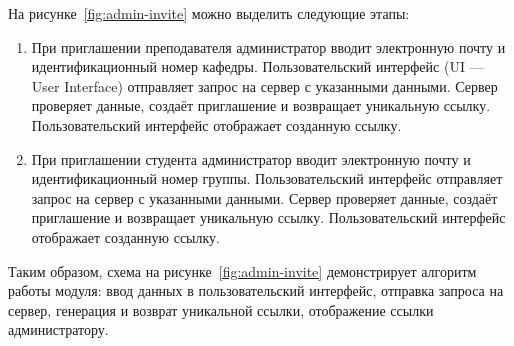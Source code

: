 На рисунке~\ref{fig:admin-invite} можно выделить следующие этапы:
\begin{enumerate}
    \item При приглашении преподавателя администратор вводит электронную почту и идентификационный номер кафедры. Пользовательский интерфейс (UI — User Interface) отправляет запрос на сервер с указанными данными. Сервер проверяет данные, создаёт приглашение и возвращает уникальную ссылку. Пользовательский интерфейс отображает созданную ссылку.

    \item При приглашении студента администратор вводит электронную почту и идентификационный номер группы. Пользовательский интерфейс отправляет запрос на сервер с указанными данными. Сервер проверяет данные, создаёт приглашение и возвращает уникальную ссылку. Пользовательский интерфейс отображает созданную ссылку.
\end{enumerate}

Таким образом, схема на рисунке~\ref{fig:admin-invite} демонстрирует алгоритм работы модуля: ввод данных в пользовательский интерфейс, отправка запроса на сервер, генерация и возврат уникальной ссылки, отображение ссылки администратору.
